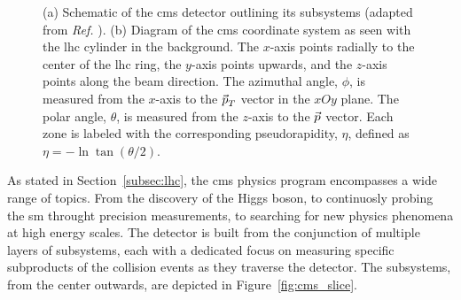 \begin{figure}[h]
	\centering
	\caption[CMS detector and coordinate system]{(a) Schematic of the \acrshort{cms} detector outlining its subsystems (adapted from \textit{Ref.} \cite{CERN:39040}). (b) Diagram of the \acrshort{cms} coordinate system as seen with the \acrshort{lhc} cylinder in the background. The $x$-axis points radially to the center of the \acrshort{lhc} ring, the $y$-axis points upwards, and the $z$-axis points along the beam direction. The azimuthal angle, $\phi$, is measured from the $x$-axis to the $\vec{\mkern0mup}_T$ vector in the $xOy$ plane. The polar angle, $\theta$, is measured from the $z$-axis to the $\vec{\mkern0mup}$ vector. Each zone is labeled with the corresponding pseudorapidity, $\eta$, defined as $\eta = - \ln \tan (\theta / 2)$.}
	\label{fig:cms_images}
\end{figure}

As stated in Section~\ref{subsec:lhc}, the \acrshort{cms} physics program encompasses a wide range of topics. From the discovery of the Higgs boson, to continuosly probing the \acrshort{sm} throught precision measurements, to searching for new physics phenomena at high energy scales. The detector is built from the conjunction of multiple layers of subsystems, each with a dedicated focus on measuring specific subproducts of the collision events as they traverse the detector. The subsystems, from the center outwards, are depicted in Figure~\ref{fig:cms_slice}.

